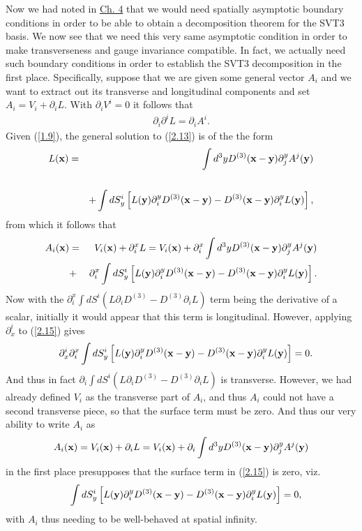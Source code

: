Now we had noted in \hyperref[c:decomposition_theorem]{Ch. 4} that we would need spatially asymptotic boundary conditions in order to be able to obtain a decomposition theorem for the SVT3 basis. We now see that we need this very same asymptotic condition in order to make transverseness and gauge invariance compatible. In fact, we actually need such boundary conditions in order to establish the SVT3 decomposition in the first place. Specifically, suppose that we are given some general vector $A_i$ and we want to extract out its transverse and longitudinal components and set $A_i=V_i+\partial_iL$. With $\partial_iV^i=0$ it follows that
%
\begin{eqnarray}
\partial_i\partial^iL=\partial_iA^i.
\label{2.13}
\end{eqnarray}
%
Given (\ref{1.9}), the general  solution to (\ref{2.13}) is of the the form 
%
\begin{eqnarray}
L({\bf x})&=&\int d^3yD^{(3)}(\mathbf{x}-\mathbf{y})\partial^y_jA^j({\bf y})\\
\nonumber\\
&&+\int dS_y^i\left[L({\bf y})\partial^y_iD^{(3)}(\mathbf{x}-\mathbf{y})-D^{(3)}(\mathbf{x}-\mathbf{y})\partial^y_iL({\bf y})\right],
\label{2.14}
\end{eqnarray}
%
from which it follows that 
%
\begin{eqnarray}
A_i({\bf x})&=&V_i({\bf x})+\partial^x_iL=V_i({\bf x})+\partial^x_i\int d^3yD^{(3)}(\mathbf{x}-\mathbf{y})\partial^y_jA^j({\bf y})
\nonumber\\
&+&\partial^x_i\int dS_y^i\left[L({\bf y})\partial^y_iD^{(3)}(\mathbf{x}-\mathbf{y})-D^{(3)}(\mathbf{x}-\mathbf{y})\partial^y_iL({\bf y})\right].
\label{2.15}
\end{eqnarray}
%
Now with the $\partial^x_i\int dS^i(L\partial_iD^{(3)}-D^{(3)}\partial_iL)$ term being the derivative of a scalar, initially it would appear that this term is longitudinal. However, applying $\partial_x^i$ to (\ref{2.15}) gives 
%
\begin{eqnarray}
&&\partial_x^i\partial^x_i\int dS_y^i\left[L({\bf y})\partial^y_iD^{(3)}(\mathbf{x}-\mathbf{y})-D^{(3)}(\mathbf{x}-\mathbf{y})\partial^y_iL({\bf y})\right]=0.
\label{2.16}
\end{eqnarray}
%
And thus in fact $\partial_i\int dS^i(L\partial_iD^{(3)}-D^{(3)}\partial_iL)$ is transverse. However, we had already defined $V_i$ as the transverse part of $A_i$, and thus $A_i$ could not have a second transverse piece, so that the surface term must be zero. And thus our very ability to write $A_i$ as
%
\begin{eqnarray}
A_i({\bf x})=V_i({\bf x})+\partial_iL=V_i({\bf x})+\partial_i\int d^3yD^{(3)}(\mathbf{x}-\mathbf{y})\partial^y_jA^j({\bf y})
\label{2.17}
\end{eqnarray}
%
in the first place presupposes that the surface term in (\ref{2.15}) is zero, viz.
%
\begin{eqnarray}
&&\int dS_y^i\left[L({\bf y})\partial^y_iD^{(3)}(\mathbf{x}-\mathbf{y})-D^{(3)}(\mathbf{x}-\mathbf{y})\partial^y_iL({\bf y})\right]
=0,
\label{2.18}
\end{eqnarray}
%
with $A_i$ thus needing to be well-behaved at spatial infinity. 

